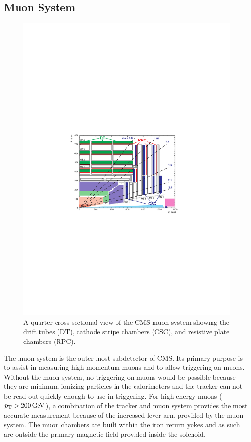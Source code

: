\subsection{Muon System}

\begin{figure}[!htbp]
    \centering
    \includegraphics[width=\textwidth]{figures/muon_layout.pdf}
    \caption[
        A quarter cross-sectional view of the CMS muon system.
    ]{
        A quarter cross-sectional view of the CMS muon system showing the drift
        tubes (DT), cathode stripe chambers (CSC), and resistive plate chambers
        (RPC).
    }
    \label{fig:muon_layout}
\end{figure}

The muon system is the outer most subdetector of CMS. Its primary purpose is to
assist in measuring high momentum muons and to allow triggering on muons.
Without the muon system, no triggering on muons would be possible because they
are minimum ionizing particles in the calorimeters and the tracker can not be
read out quickly enough to use in triggering. For high energy muons ($p_{\mathrm{T}} > 200
\,\text{Ge\hspace{-.08em}V}$), a combination of the tracker and muon system provides the most accurate
measurement because of the increased lever arm provided by the muon system. The
muon chambers are built within the iron return yokes and as such are outside
the primary magnetic field provided inside the solenoid.

